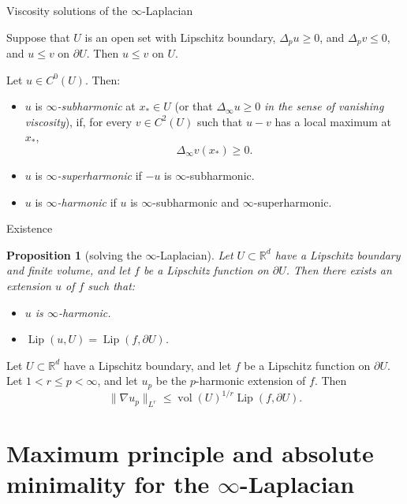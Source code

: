 \documentclass[10pt]{beamer}
\newcommand{\RR}{\mathbb{R}}
\DeclareMathOperator{\Lip}{Lip}
\DeclareMathOperator{\vol}{vol}
\newtheorem{proposition}{Proposition}
\begin{document}
\begin{frame}{Viscosity solutions of the $\infty$-Laplacian}
\begin{lemma}
Suppose that $U$ is an open set with Lipschitz boundary, $\Delta_p u \geq 0$, and $\Delta_p v \leq 0$, and $u \leq v$ on $\partial U$.
Then $u \leq v$ on $U$. \pause
\end{lemma}   
 
\begin{definition}
Let $u \in C^0(U)$. Then:
\begin{itemize}
\item $u$ is \emph{$\infty$-subharmonic} at $x_* \in U$ (or that $\Delta_\infty u \geq 0$ \emph{in the sense of vanishing viscosity}), if, for every $v \in C^2(U)$ such that $u - v$ has a local maximum at $x_*$,
$$\Delta_\infty v(x_*) \geq 0.$$
\item $u$ is \emph{$\infty$-superharmonic} if $-u$ is $\infty$-subharmonic.
\item $u$ is \emph{$\infty$-harmonic} if $u$ is $\infty$-subharmonic and $\infty$-superharmonic.
\end{itemize}
\end{definition}
\end{frame}

\begin{frame}{Existence} 
\begin{proposition}[solving the $\infty$-Laplacian]
Let $U \subset \RR^d$ have a Lipschitz boundary and finite volume, and let $f$ be a Lipschitz function on $\partial U$.
Then there exists an extension $u$ of $f$ such that: \pause
\begin{itemize}
\item $u$ is $\infty$-harmonic.
\item $\Lip(u, U) = \Lip(f, \partial U)$. \pause 
\end{itemize}
\end{proposition}

\begin{lemma}
Let $U \subset \RR^d$ have a Lipschitz boundary, and let $f$ be a Lipschitz function on $\partial U$.
Let $1 < r \leq p < \infty$, and let $u_p$ be the $p$-harmonic extension of $f$. Then
$$\|\nabla u_p\|_{L^r} \leq \vol(U)^{1/r} \Lip(f, \partial U) .$$
\end{lemma}
\end{frame}

\section{Maximum principle and absolute minimality for the \texorpdfstring{$\infty$-Laplacian}{infinity-Laplacian}}
\end{document}
